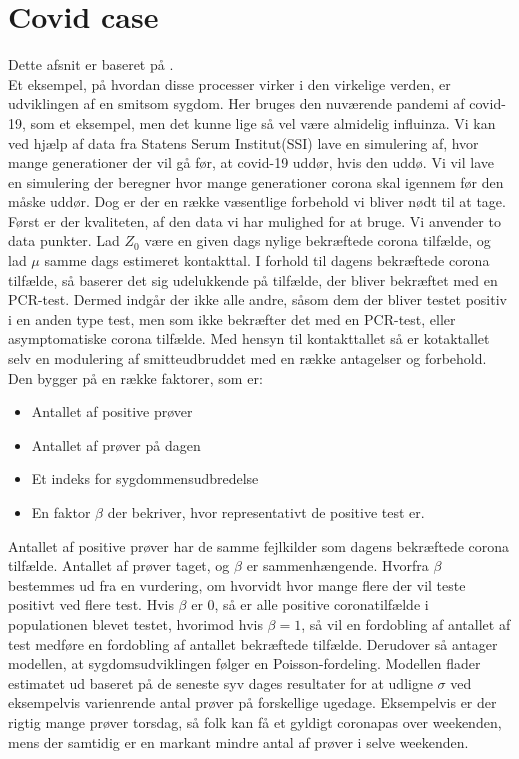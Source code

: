 \section {Covid case}
Dette afsnit er baseret på \cite{fremskrivning}.\\
Et eksempel, på hvordan  disse processer virker i den virkelige verden, er udviklingen af en smitsom sygdom.
Her bruges den nuværende pandemi af covid-19, som et eksempel, men det kunne lige så vel være almidelig influinza.
Vi kan ved hjælp af data fra Statens Serum Institut(SSI) lave en simulering af, hvor mange generationer der vil gå før, at covid-19 uddør, hvis den uddø.
Vi vil lave en simulering der beregner hvor mange generationer corona skal igennem før den måske uddør. 
Dog er der en række væsentlige forbehold vi bliver nødt til at tage. 
Først er der kvaliteten, af den data vi har mulighed for at bruge.
Vi anvender to data punkter. Lad $Z_0$  være en given dags nylige bekræftede corona tilfælde, og lad $\mu$  samme dags estimeret kontakttal.
I forhold til dagens bekræftede corona tilfælde, så baserer det sig udelukkende på tilfælde, der bliver bekræftet med en PCR-test. Dermed indgår der ikke alle andre, såsom dem der bliver testet positiv i en anden type test, men som ikke bekræfter det med en PCR-test, eller asymptomatiske corona tilfælde.
Med hensyn til kontakttallet så er kotaktallet selv en modulering af smitteudbruddet med en række antagelser og forbehold.
Den bygger på en række faktorer, som er: 
\begin{itemize}
    \item Antallet af positive prøver
    \item Antallet af prøver på dagen
    \item Et indeks for sygdommensudbredelse
    \item En faktor $\beta$ der bekriver, hvor representativt de positive test er.
\end{itemize}
 Antallet af positive prøver har de samme fejlkilder som dagens bekræftede corona tilfælde.
 Antallet af prøver taget, og $\beta$ er sammenhængende. Hvorfra $\beta$ bestemmes ud fra en vurdering, om hvorvidt hvor mange flere der vil teste positivt ved flere test. Hvis $\beta$ er $0$, så er alle positive coronatilfælde i populationen blevet testet, hvorimod hvis $\beta=1$, så vil en fordobling af antallet af test medføre en fordobling af antallet bekræftede tilfælde.
Derudover så antager modellen, at sygdomsudviklingen følger en Poisson-fordeling.
Modellen flader estimatet ud baseret på de seneste syv dages resultater for at udligne $\sigma$ ved eksempelvis varienrende antal prøver på forskellige ugedage. Eksempelvis er der rigtig mange prøver torsdag, så folk kan få et gyldigt coronapas over weekenden, mens der samtidig er en markant mindre antal af prøver i selve weekenden.
